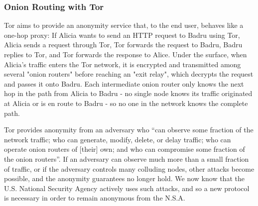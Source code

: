   \subsubsection{Onion Routing with Tor}
    Tor aims to provide an anonymity service that, to the end user, behaves like
    a one-hop proxy: If Alicia wants to send an HTTP request to Badru using Tor,
    Alicia sends a request through Tor, Tor forwards the request to Badru, Badru
    replies to Tor, and Tor forwards the response to Alice. Under the surface,
    when Alicia's traffic enters the Tor network, it is encrypted and
    transmitted among several "onion routers" before reaching an "exit relay",
    which decrypts the request and passes it onto Badru. Each intermediate onion
    router only knows the next hop in the path from Alicia to Badru - no single
    node knows its traffic originated at Alicia or is en route to Badru - so no
    one in the network knows the complete path.

    Tor provides anonymity from an adversary who ``can observe some fraction of
    the network traffic; who can generate, modify, delete, or delay traffic; who
    can operate onion routers of [their] own; and who can compromise some
    fraction of the onion routers''\cite{dingledine_tor:_2004}. If an adversary
    can observe much more than a small fraction of traffic, or if the adversary
    controls many colluding nodes, other attacks become possible, and the
    anonymity guarantees no longer hold. We now know that the U.S. National
    Security Agency actively uses such attacks, and so a new protocol is
    necessary in order to remain anonymous from the N.S.A.

